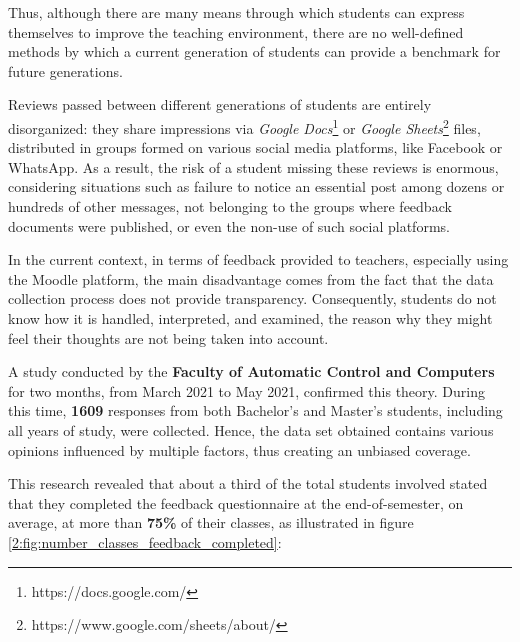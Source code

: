     Thus, although there are many means through which students can express themselves to improve the teaching environment, there are no well-defined methods by which a current generation of students can provide a benchmark for future generations.
    
    Reviews passed between different generations of students are entirely disorganized: they share impressions via \textit{Google Docs}\footnote{https://docs.google.com/} or \textit{Google Sheets}\footnote{https://www.google.com/sheets/about/} files, distributed in groups formed on various social media platforms, like Facebook or WhatsApp. As a result, the risk of a student missing these reviews is enormous, considering situations such as failure to notice an essential post among dozens or hundreds of other messages, not belonging to the groups where feedback documents were published, or even the non-use of such social platforms.
    
	In the current context, in terms of feedback provided to teachers, especially using the Moodle platform, the main disadvantage comes from the fact that the data collection process does not provide transparency. Consequently, students do not know how it is handled, interpreted, and examined, the reason why they might feel their thoughts are not being taken into account.
	
	A study conducted by the \textbf{Faculty of Automatic Control and Computers} for two months, from March 2021 to May 2021, confirmed this theory. During this time, \textbf{1609} responses from both Bachelor’s and Master’s students, including all years of study, were collected. Hence, the data set obtained contains various opinions influenced by multiple factors, thus creating an unbiased coverage.
	
    This research revealed that about a third of the total students involved stated that they completed the feedback questionnaire at the end-of-semester, on average, at more than \textbf{75\%} of their classes, as illustrated in figure \ref{2:fig:number_classes_feedback_completed}: 
	
	\clearpage
	
